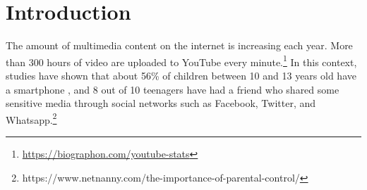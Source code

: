 








\section{Introduction}
\label{sec:introduction}

The amount of multimedia content on the internet is increasing each year.
More than 300 hours of video are uploaded to YouTube every minute.\footnote{\url{https://biographon.com/youtube-stats}}
In this context, studies have shown that about 56\% of children between 10 and 13 years old have a smartphone \cite{remosoftware,chollet2017xception}, and 8 out of 10 teenagers have had a friend who shared some sensitive media through social networks such as Facebook, Twitter, and Whatsapp.\footnote{https://www.netnanny.com/the-importance-of-parental-control/}



